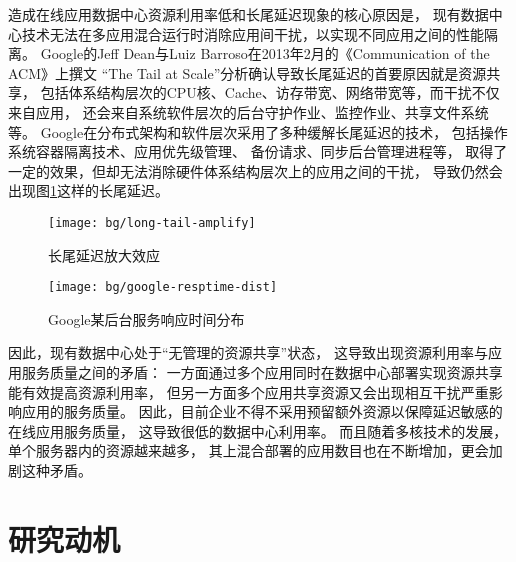 造成在线应用数据中心资源利用率低和长尾延迟现象的核心原因是，
现有数据中心技术无法在多应用混合运行时消除应用间干扰，以实现不同应用之间的性能隔离。
Google的Jeff Dean与Luiz Barroso在2013年2月的《Communication of the ACM》上撰文
``The Tail at Scale''\cite{dean_tail_2013}分析确认导致长尾延迟的首要原因就是资源共享，
包括体系结构层次的CPU核、Cache、访存带宽、网络带宽等，而干扰不仅来自应用，
还会来自系统软件层次的后台守护作业、监控作业、共享文件系统等。
Google在分布式架构和软件层次采用了多种缓解长尾延迟的技术，
包括操作系统容器隔离技术\cite{cgroup}、应用优先级管理\cite{Reiss_googletrace_2012}、
备份请求\cite{dean_achieving_2012}、同步后台管理进程\cite{dean_achieving_2012}等，
取得了一定的效果，但却无法消除硬件体系结构层次上的应用之间的干扰，
导致仍然会出现图\ref{fig:google-resptime-dist}这样的长尾延迟。

\begin{figure}
\begin{minipage}[b]{0.48\textwidth}
  \centering
  \texttt{[image: bg/long-tail-amplify]}
  \caption[长尾延迟放大效应]{长尾延迟放大效应\cite{dean_tail_2013}}
  \label{fig:long-tail-amplify}
\end{minipage}\hfill
\begin{minipage}[b]{0.48\textwidth}
  \centering
  \texttt{[image: bg/google-resptime-dist]}
  \caption[Google某后台服务响应时间分布]{Google某后台服务响应时间分布\cite{Krushevskaja:2013}}
  \label{fig:google-resptime-dist}
\end{minipage}
\end{figure}

因此，现有数据中心处于``无管理的资源共享''状态，
这导致出现资源利用率与应用服务质量之间的矛盾：
一方面通过多个应用同时在数据中心部署实现资源共享能有效提高资源利用率，
但另一方面多个应用共享资源又会出现相互干扰严重影响应用的服务质量。
因此，目前企业不得不采用预留额外资源以保障延迟敏感的在线应用服务质量，
这导致很低的数据中心利用率。
而且随着多核技术的发展，单个服务器内的资源越来越多，
其上混合部署的应用数目也在不断增加，更会加剧这种矛盾。


\section{研究动机}

